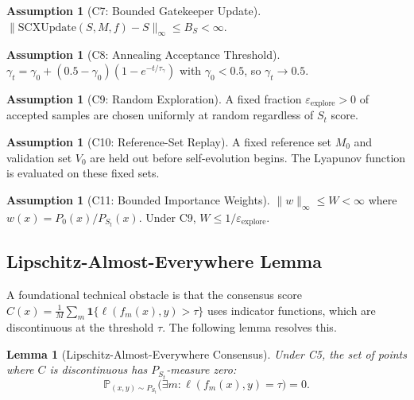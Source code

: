 \documentclass[11pt,a4paper]{article}
\theoremstyle{plain}
\newtheorem{lemma}[theorem]{Lemma}
\theoremstyle{definition}
\newtheorem{assumption}[theorem]{Assumption}
\theoremstyle{remark}
\newcommand{\Pbb}{\mathbb{P}}
\newcommand{\ind}[1]{\mathbf{1}\{#1\}}
\begin{document}
\begin{assumption}[C7: Bounded Gatekeeper Update]\label{ass:c7}
    $\|\text{SCXUpdate}(S, M, f) - S\|_\infty \leq B_S < \infty$.
\end{assumption}

\begin{assumption}[C8: Annealing Acceptance Threshold]\label{ass:c8}
    $\gamma_t = \gamma_0 + (0.5 - \gamma_0)(1 - e^{-t/\tau_\gamma})$ with $\gamma_0 < 0.5$, so $\gamma_t \to 0.5$.
\end{assumption}

\begin{assumption}[C9: Random Exploration]\label{ass:c9}
    A fixed fraction $\varepsilon_{\text{explore}} > 0$ of accepted samples are chosen uniformly at random regardless of $S_t$ score.
\end{assumption}

\begin{assumption}[C10: Reference-Set Replay]\label{ass:c10}
    A fixed reference set $M_0$ and validation set $V_0$ are held out before self-evolution begins. The Lyapunov function is evaluated on these fixed sets.
\end{assumption}

\begin{assumption}[C11: Bounded Importance Weights]\label{ass:c11}
    $\|w\|_\infty \leq W < \infty$ where $w(x) = P_0(x)/P_{S_t}(x)$. Under C9, $W \leq 1/\varepsilon_{\text{explore}}$.
\end{assumption}

\subsection{Lipschitz-Almost-Everywhere Lemma}

A foundational technical obstacle is that the consensus score $C(x) = \frac{1}{M}\sum_m \ind{\ell(f_m(x), y) > \tau}$ uses indicator functions, which are discontinuous at the threshold $\tau$. The following lemma resolves this.

\begin{lemma}[Lipschitz-Almost-Everywhere Consensus]\label{lem:lae}
    Under C5, the set of points where $C$ is discontinuous has $P_{S_t}$-measure zero:
    \begin{equation}
        \Pbb_{(x,y) \sim P_{S_t}}\bigl(\exists m: \ell(f_m(x), y) = \tau\bigr) = 0.
    \end{equation}
\end{lemma}
\end{document}
